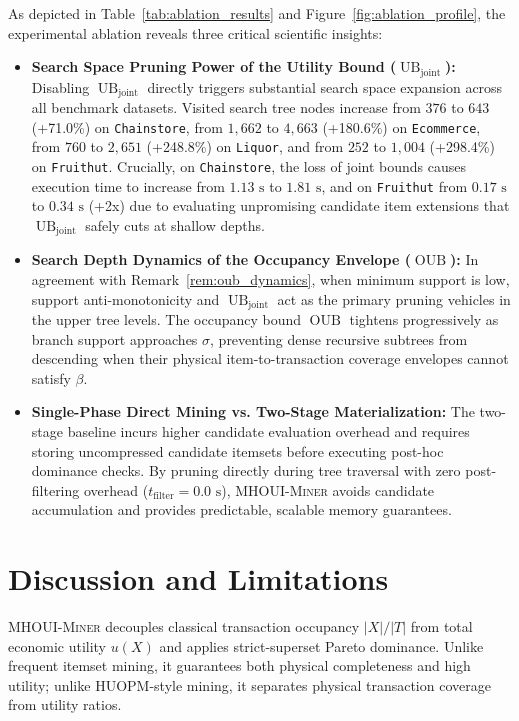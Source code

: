 \documentclass[runningheads]{llncs}
\newcommand{\MHOUIminer}{\textsc{MHOUI-Miner}}
\newcommand{\OUB}{\operatorname{OUB}}
\newcommand{\UBjoint}{\operatorname{UB}_{\mathrm{joint}}}
\begin{document}
As depicted in Table~\ref{tab:ablation_results} and Figure~\ref{fig:ablation_profile}, the experimental ablation reveals three critical scientific insights:
\begin{itemize}
    \item \textbf{Search Space Pruning Power of the Utility Bound ($\UBjoint$):} Disabling $\UBjoint$ directly triggers substantial search space expansion across all benchmark datasets. Visited search tree nodes increase from $376$ to $643$ (+71.0\%) on \texttt{Chainstore}, from $1{,}662$ to $4{,}663$ (+180.6\%) on \texttt{Ecommerce}, from $760$ to $2{,}651$ (+248.8\%) on \texttt{Liquor}, and from $252$ to $1{,}004$ (+298.4\%) on \texttt{Fruithut}. Crucially, on \texttt{Chainstore}, the loss of joint bounds causes execution time to increase from $1.13\text{ s}$ to $1.81\text{ s}$, and on \texttt{Fruithut} from $0.17\text{ s}$ to $0.34\text{ s}$ (+2x) due to evaluating unpromising candidate item extensions that $\UBjoint$ safely cuts at shallow depths.
    \item \textbf{Search Depth Dynamics of the Occupancy Envelope ($\OUB$):} In agreement with Remark~\ref{rem:oub_dynamics}, when minimum support is low, support anti-monotonicity and $\UBjoint$ act as the primary pruning vehicles in the upper tree levels. The occupancy bound $\OUB$ tightens progressively as branch support approaches $\sigma$, preventing dense recursive subtrees from descending when their physical item-to-transaction coverage envelopes cannot satisfy $\beta$.
    \item \textbf{Single-Phase Direct Mining vs. Two-Stage Materialization:} The two-stage baseline incurs higher candidate evaluation overhead and requires storing uncompressed candidate itemsets before executing post-hoc dominance checks. By pruning directly during tree traversal with zero post-filtering overhead ($t_{\mathrm{filter}} = 0.0\text{ s}$), \MHOUIminer{} avoids candidate accumulation and provides predictable, scalable memory guarantees.
\end{itemize}

\section{Discussion and Limitations}
\label{sec:discussion}

\MHOUIminer{} decouples classical transaction occupancy $|X|/|T|$ from total economic utility $u(X)$ and applies strict-superset Pareto dominance. Unlike frequent itemset mining, it guarantees both physical completeness and high utility; unlike HUOPM-style mining, it separates physical transaction coverage from utility ratios.
\end{document}
